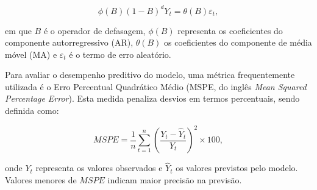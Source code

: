 \documentclass[journal]{IEEEtran}
\begin{document}
\begin{equation}
\phi(B)(1-B)^{d} Y_{t} = \theta(B)\varepsilon_{t},
\end{equation}

em que $B$ é o operador de defasagem, $\phi(B)$ representa os coeficientes do componente autorregressivo (AR), $\theta(B)$ os coeficientes do componente de média móvel (MA) e $\varepsilon_{t}$ é o termo de erro aleatório.

Para avaliar o desempenho preditivo do modelo, uma métrica frequentemente utilizada é o Erro Percentual Quadrático Médio (MSPE, do inglês \textit{Mean Squared Percentage Error}). Esta medida penaliza desvios em termos percentuais, sendo definida como:

\begin{equation}
MSPE = \frac{1}{n} \sum_{t=1}^{n} \left( \frac{Y_{t} - \hat{Y}_{t}}{Y_{t}} \right)^{2} \times 100,
\end{equation}

onde $Y_{t}$ representa os valores observados e $\hat{Y}_{t}$ os valores previstos pelo modelo. Valores menores de $MSPE$ indicam maior precisão na previsão.






\end{document}
